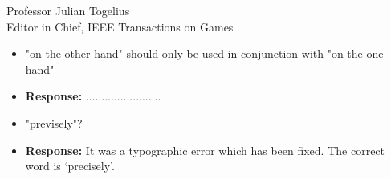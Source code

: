 \documentclass[10pt]{letter} %
\begin{document}
\begin{letter}{Professor Julian Togelius \\ Editor in Chief, IEEE Transactions on Games}
\begin{enumerate}
\begin{itemize}
\begin{itemize}
				\item 	"on the other hand" should only be used in conjunction with "on the one hand"\\
				\item {\bf Response:} ........................
				\item 	"previsely"?\\
				\item {\bf Response:} It was a typographic error which has been fixed. The correct word is `precisely'.
			
			\end{itemize}
	
\end{itemize}
\end{enumerate}
 






\end{letter}
\end{document}
